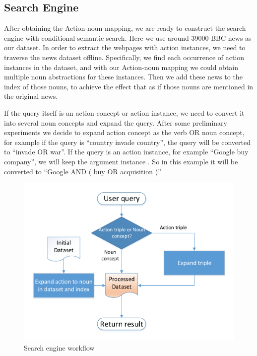 \subsection{Search Engine}
After obtaining the Action-noun mapping, we are ready to construct the search engine
with conditional semantic search. Here we use around 39000 BBC news as our dataset.
In order to extract the webpages with action instances, we need to traverse the 
news dataset offline. Specifically, we find each occurrence of action instances
in the dataset, and with our Action-noun mapping we could obtain multiple noun abstractions
for these instances. Then we add these news to the index of those nouns, to achieve the
effect that as if those nouns are mentioned in the original news.

If the query itself is an action concept or action instance, we need to convert it into 
several noun concepts and expand the query. After some preliminary experiments we decide
to expand action concept as the verb OR noun concept, for example if the query is ``country
invade country'', the query will be converted to ``invade OR war''. If the query is an 
action instance, for example ``Google buy company'', we will keep the argument instance
. So in this example it will be converted to ``Google AND ( buy OR acquisition )''


\begin{figure}[h]
\includegraphics[width=\columnwidth]{img/ac4}
\caption{Search engine workflow}
\label{fig:search engine}
\end{figure}


